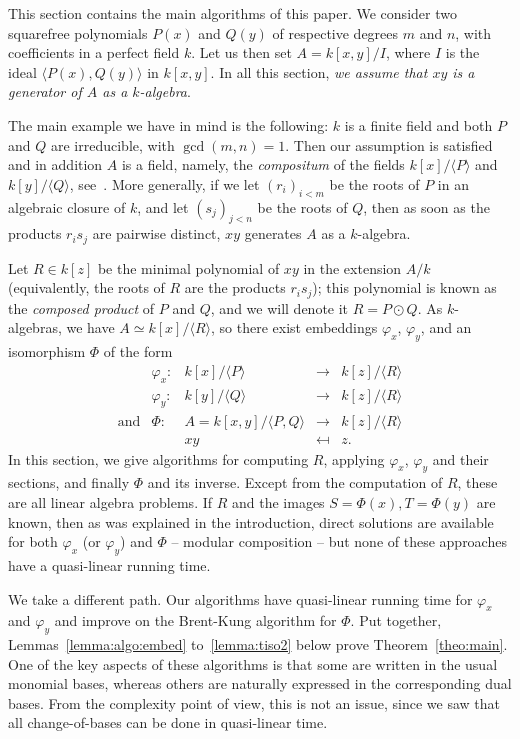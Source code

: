 \documentclass{sig-alternate}
\newcounter{algo}
\newcommand{\ang}[1]{\langle#1\rangle}
\begin{document}
This section contains the main algorithms of this paper. We consider
two squarefree polynomials $P(x)$ and $Q(y)$ of respective degrees $m$
and $n$, with coefficients in a perfect field $k$. Let us then set
$A=k[x,y]/I$, where $I$ is the ideal $\ang{P(x),Q(y)}$ in $k[x,y]$. In
all this section, {\em we assume that $xy$ is a generator of $A$ as a
  $k$-algebra}. 

The main example we have in mind is the following: $k$ is a finite
field and both $P$ and $Q$ are irreducible, with $\gcd(m,n)=1$. Then
our assumption is satisfied and in addition $A$ is a field, namely,
the {\em compositum} of the fields $k[x]/\ang{P}$ and $k[y]/\ang{Q}$,
see~\cite{BrCa87}. More generally, if we let $(r_i)_{i<m}$ be the
roots of $P$ in an algebraic closure of $k$, and let $(s_j)_{j<n}$ be
the roots of $Q$, then as soon as the products $r_i s_j$ are pairwise
distinct, $xy$ generates $A$ as a $k$-algebra.

Let $R \in k[z]$ be the minimal polynomial of $xy$ in the extension
$A/k$ (equivalently, the roots of $R$ are the products $r_i s_j$);
this polynomial is known as the {\em composed product} of $P$ and $Q$,
and we will denote it $R = P \odot Q$. As $k$-algebras, we have $A
\simeq k[x]/\ang{R}$, so there exist embeddings $\varphi_x$, $\varphi_y$, 
and an isomorphism $\Phi$
of the form
$$
\begin{array}{ccccc}
&\varphi_x: & k[x]/\ang{P} & \to & k[z]/\ang{R}\\[2mm]
& \varphi_y: & k[y]/\langle Q \rangle & \to & k[z]/\ang{R}\\[2mm]
\text{and}& \Phi:&  A=k[x,y]/\langle P,Q\rangle & \to & k[z]/\ang{R} \\
& &  xy & \mapsfrom & z.
\end{array}$$
In this section, we give algorithms for computing $R$, applying
$\varphi_x$, $\varphi_y$ and their sections, and finally $\Phi$ and its inverse. Except from the
computation of $R$, these are all linear algebra problems. If $R$ and
the images $S=\Phi(x),T=\Phi(y)$ are known, then as was explained in
the introduction, direct solutions are available for both $\varphi_x$
(or $\varphi_y$) and $\Phi$ -- modular composition -- but none of
these approaches have a quasi-linear running time.

We take a different path. Our algorithms have quasi-linear running
time for $\varphi_x$ and $\varphi_y$ and improve on the Brent-Kung
algorithm for $\Phi$. Put together, Lemmas~\ref{lemma:algo:embed}
to~\ref{lemma:tiso2} below prove Theorem~\ref{theo:main}. One of the
key aspects of these algorithms is that some are written in the usual
monomial bases, whereas others are naturally expressed in the
corresponding dual bases. From the complexity point of view, this is
not an issue, since we saw that all change-of-bases can be done in
quasi-linear time.
\end{document}
